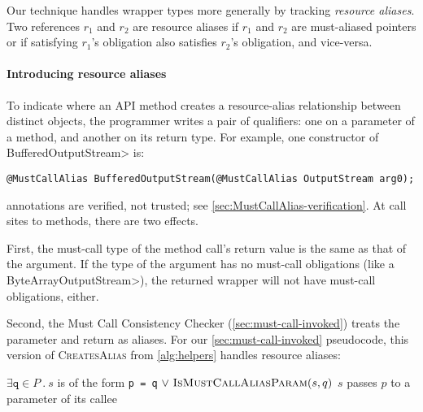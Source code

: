 Our technique handles wrapper types more generally by tracking \emph{resource
aliases}.  Two references $r_1$ and $r_2$ are resource aliases
if $r_1$ and $r_2$ are must-aliased pointers or if
satisfying $r_1$'s \MustCall obligation also satisfies $r_2$'s
  obligation, and vice-versa.

\paragraph{Introducing resource aliases}
To indicate where an API method creates a resource-alias
relationship between distinct objects, the programmer writes a pair of 
\MustCallAlias qualifiers:  one on a parameter
of a method, and another on its return type.
For example, one constructor of \<BufferedOutputStream> is:
\begin{lstlisting}[aboveskip=0.5em,belowskip=0.5em]
@MustCallAlias BufferedOutputStream(@MustCallAlias OutputStream arg0);
\end{lstlisting}
\noindent
\MustCallAlias annotations are verified, not trusted; see \cref{sec:MustCallAlias-verification}.
At call sites to \MustCallAlias methods, there are two effects.

First, the must-call type of the method call's return value
is the same as that of the \MustCallAlias
argument.  If the type of the argument has no must-call obligations (like a
\<ByteArrayOutputStream>), the returned wrapper will not have must-call
obligations, either.

Second,
the Must Call Consistency Checker
(\cref{sec:must-call-invoked}) treats the \MustCallAlias parameter and return as
aliases.  For our \cref{sec:must-call-invoked} pseudocode, this
version of \textsc{CreatesAlias} from \cref{alg:helpers} handles resource aliases:
\begin{algorithmic}
    \State \Return $\exists \mathtt{q} \in P\ .\ s$ is of the form \texttt{p = q}\newline
         \hspace*{8em} $\vee\ \textsc{IsMustCallAliasParam}(s,q)$ 
  \EndProcedure
    \State \Return $s$ passes $p$ to a \MustCallAlias parameter of its callee
  \EndProcedure
\end{algorithmic}


